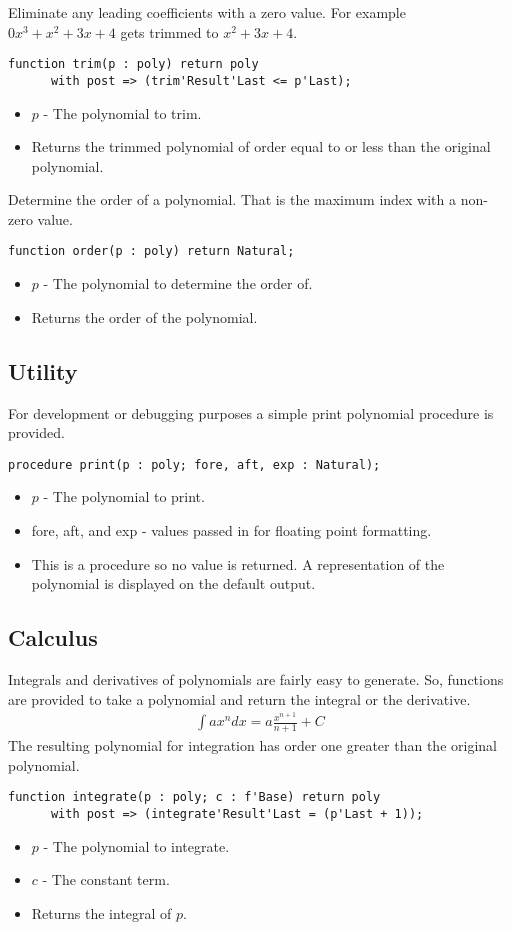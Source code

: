 \documentclass[10pt, openany]{book}
\begin{document}
Eliminate any leading coefficients with a zero value.  For example $0x^3+x^2+3x+4$ gets trimmed to $x^2+3x+4$.
\begin{lstlisting}
function trim(p : poly) return poly
      with post => (trim'Result'Last <= p'Last);
\end{lstlisting}
\begin{itemize}
  \item $p$ - The polynomial to trim.
  \item Returns the trimmed polynomial of order equal to or less than the original polynomial.
\end{itemize}

Determine the order of a polynomial.  That is the maximum index with a non-zero value.
\begin{lstlisting}
function order(p : poly) return Natural;
\end{lstlisting}
\begin{itemize}
  \item $p$ - The polynomial to determine the order of.
  \item Returns the order of the polynomial.
\end{itemize}

\subsection{Utility}
For development or debugging purposes a simple print polynomial procedure is provided.
\begin{lstlisting}
procedure print(p : poly; fore, aft, exp : Natural);
\end{lstlisting}
\begin{itemize}
  \item $p$ - The polynomial to print.
  \item fore, aft, and exp - values passed in for floating point formatting.
  \item This is a procedure so no value is returned.  A representation of the polynomial is displayed on the default output.
\end{itemize}

\subsection{Calculus}
Integrals and derivatives of polynomials are fairly easy to generate.  So, functions are provided to take a polynomial and return the integral or the derivative.
\begin{align*}
  \int ax^n dx = a\frac{x^{n+1}}{n+1}+C
\end{align*}
The resulting polynomial for integration has order one greater than the original polynomial.
\begin{lstlisting}
function integrate(p : poly; c : f'Base) return poly
      with post => (integrate'Result'Last = (p'Last + 1));
\end{lstlisting}
\begin{itemize}
  \item $p$ - The polynomial to integrate.
  \item $c$ - The constant term.
  \item Returns the integral of $p$.
\end{itemize}
\end{document}
